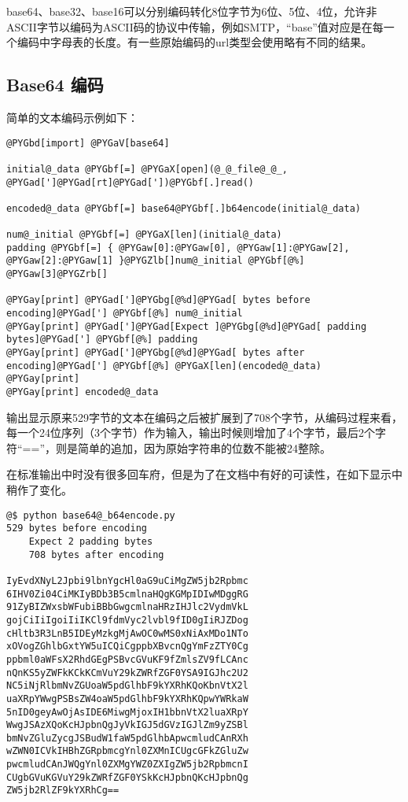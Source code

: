 \documentclass[letterpaper,10pt,english]{manual}
\begin{document}
base64、base32、base16可以分别编码转化8位字节为6位、5位、4位，允许非ASCII字节以编码为ASCII码的协议中传输，例如SMTP，“base”值对应是在每一个编码中字母表的长度。有一些原始编码的url类型会使用略有不同的结果。


\subsection{Base64 编码}

简单的文本编码示例如下：

\begin{Verbatim}[commandchars=@\[\]]
@PYGbd[import] @PYGaV[base64]

initial@_data @PYGbf[=] @PYGaX[open](@_@_file@_@_, @PYGad[']@PYGad[rt]@PYGad['])@PYGbf[.]read()

encoded@_data @PYGbf[=] base64@PYGbf[.]b64encode(initial@_data)

num@_initial @PYGbf[=] @PYGaX[len](initial@_data)
padding @PYGbf[=] { @PYGaw[0]:@PYGaw[0], @PYGaw[1]:@PYGaw[2], @PYGaw[2]:@PYGaw[1] }@PYGZlb[]num@_initial @PYGbf[@%] @PYGaw[3]@PYGZrb[]

@PYGay[print] @PYGad[']@PYGbg[@%d]@PYGad[ bytes before encoding]@PYGad['] @PYGbf[@%] num@_initial
@PYGay[print] @PYGad[']@PYGad[Expect ]@PYGbg[@%d]@PYGad[ padding bytes]@PYGad['] @PYGbf[@%] padding
@PYGay[print] @PYGad[']@PYGbg[@%d]@PYGad[ bytes after encoding]@PYGad['] @PYGbf[@%] @PYGaX[len](encoded@_data)
@PYGay[print]
@PYGay[print] encoded@_data
\end{Verbatim}

输出显示原来529字节的文本在编码之后被扩展到了708个字节，从编码过程来看，每一个24位序列（3个字节）作为输入，输出时候则增加了4个字节，最后2个字符“==”，则是简单的追加，因为原始字符串的位数不能被24整除。

在标准输出中时没有很多回车府，但是为了在文档中有好的可读性，在如下显示中稍作了变化。

\begin{Verbatim}[commandchars=@\[\]]
@$ python base64@_b64encode.py
529 bytes before encoding
    Expect 2 padding bytes
    708 bytes after encoding

IyEvdXNyL2Jpbi9lbnYgcHl0aG9uCiMgZW5jb2Rpbmc
6IHV0Zi04CiMKIyBDb3B5cmlnaHQgKGMpIDIwMDggRG
91ZyBIZWxsbWFubiBBbGwgcmlnaHRzIHJlc2VydmVkL
gojCiIiIgoiIiIKCl9fdmVyc2lvbl9fID0gIiRJZDog
cHltb3R3LnB5IDEyMzkgMjAwOC0wMS0xNiAxMDo1NTo
xOVogZGhlbGxtYW5uICQiCgppbXBvcnQgYmFzZTY0Cg
ppbml0aWFsX2RhdGEgPSBvcGVuKF9fZmlsZV9fLCAnc
nQnKS5yZWFkKCkKCmVuY29kZWRfZGF0YSA9IGJhc2U2
NC5iNjRlbmNvZGUoaW5pdGlhbF9kYXRhKQoKbnVtX2l
uaXRpYWwgPSBsZW4oaW5pdGlhbF9kYXRhKQpwYWRkaW
5nID0geyAwOjAsIDE6MiwgMjoxIH1bbnVtX2luaXRpY
WwgJSAzXQoKcHJpbnQgJyVkIGJ5dGVzIGJlZm9yZSBl
bmNvZGluZycgJSBudW1faW5pdGlhbApwcmludCAnRXh
wZWN0ICVkIHBhZGRpbmcgYnl0ZXMnICUgcGFkZGluZw
pwcmludCAnJWQgYnl0ZXMgYWZ0ZXIgZW5jb2RpbmcnI
CUgbGVuKGVuY29kZWRfZGF0YSkKcHJpbnQKcHJpbnQg
ZW5jb2RlZF9kYXRhCg==
\end{Verbatim}
\end{document}
